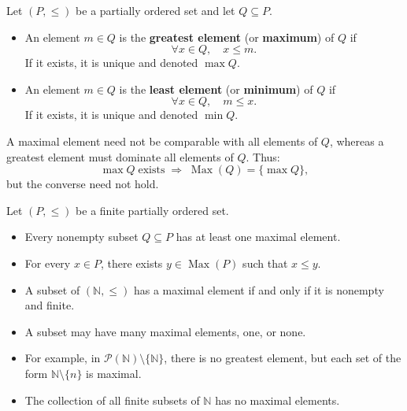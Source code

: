 \begin{definition}
Let $(P,\le)$ be a partially ordered set and let $Q \subseteq P$.

\begin{itemize}
    \item An element $m \in Q$ is the \textbf{greatest element} (or \textbf{maximum}) of $Q$ if
    \[
    \forall x \in Q, \quad x \le m.
    \]
    If it exists, it is unique and denoted $\max Q$.

    \item An element $m \in Q$ is the \textbf{least element} (or \textbf{minimum}) of $Q$ if
    \[
    \forall x \in Q, \quad m \le x.
    \]
    If it exists, it is unique and denoted $\min Q$.
\end{itemize}
\end{definition}

\begin{remark}
A maximal element need not be comparable with all elements of $Q$, whereas a greatest element must dominate all elements of $Q$. Thus:
\[
\max Q \;\text{exists} \;\Longrightarrow\; \operatorname{Max}(Q) = \{\max Q\},
\]
but the converse need not hold.
\end{remark}

\begin{proposition}
Let $(P,\le)$ be a finite partially ordered set.
\begin{itemize}
    \item Every nonempty subset $Q \subseteq P$ has at least one maximal element.
    \item For every $x \in P$, there exists $y \in \operatorname{Max}(P)$ such that $x \le y$.
\end{itemize}
\end{proposition}

\begin{remark}
\begin{itemize}
    \item A subset of $(\mathbb{N},\le)$ has a maximal element if and only if it is nonempty and finite.
    \item A subset may have many maximal elements, one, or none.
    \item For example, in $\mathcal{P}(\mathbb{N}) \setminus \{\mathbb{N}\}$, there is no greatest element, but each set of the form $\mathbb{N} \setminus \{n\}$ is maximal.
    \item The collection of all finite subsets of $\mathbb{N}$ has no maximal elements.
\end{itemize}
\end{remark}

